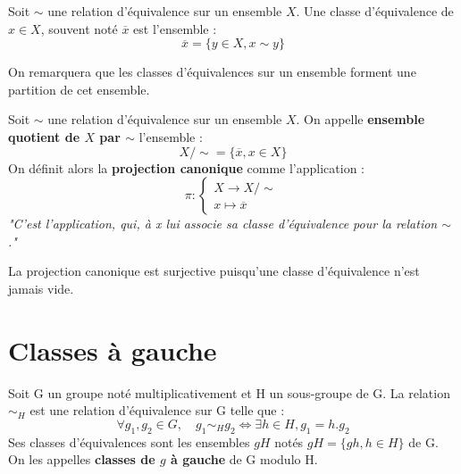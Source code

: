 \begin{definition}
    Soit $\sim$ une relation d'équivalence sur un ensemble $X$. Une classe d'équivalence de $x \in X$, 
    souvent noté $\overline{x}$ est l'ensemble :
    \[ \overline{x} = \{y \in X, x \sim y\}\]
\end{definition}

\begin{remark}
    On remarquera que les classes d'équivalences sur un ensemble forment une partition de cet ensemble. 
\end{remark}

\begin{definition}
    Soit $\sim$ une relation d'équivalence sur un ensemble $X$. On appelle \textbf{ensemble quotient de $X$ par $\sim$} l'ensemble :
        \[ X / \sim = \{\overline{x}, x \in X \} \]
    On définit alors la \textbf{projection canonique} comme l'application :
        \[ \pi :
            \begin{cases}
                X \longrightarrow X / \sim \\ 
                x \longmapsto \overline{x} 
            \end{cases}
        \]
    \emph{"C'est l'application, qui, à x lui associe sa classe d'équivalence pour la relation $\sim$."}
\end{definition}

\begin{remark}
    La projection canonique est surjective puisqu'une classe d'équivalence n'est jamais vide. 
\end{remark}


\section{Classes à gauche}

\begin{definition}
    Soit G un groupe noté multiplicativement et H un sous-groupe de G. La relation $\sim_H$ est une relation d'équivalence sur G telle que :
        \[ \forall g_1,g_2 \in G, \quad g_1 \sim_H g_2 \Longleftrightarrow \exists h \in H, g_1 = h.g_2 \] 
    Ses classes d'équivalences sont les ensembles $gH$ notés $gH = \{ gh, h \in H \}$ de G. On les appelles \textbf{classes de $g$ à gauche} de
    G modulo H.
\end{definition}

